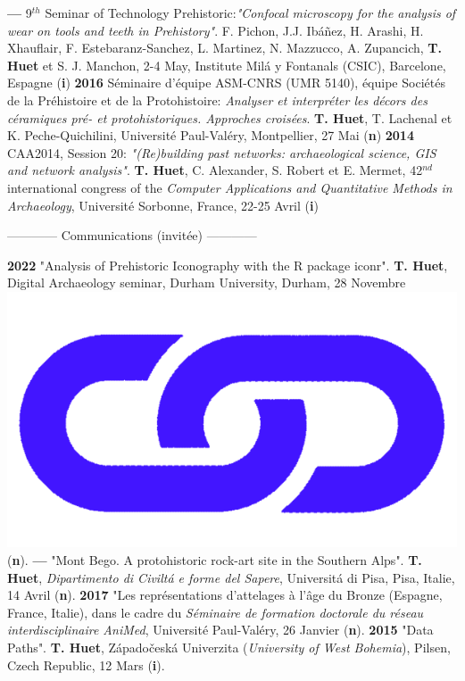 \documentclass{article}
\begin{document}
\smallbreak
\textbf{--- }9${}^{th}$ Seminar of Technology Prehistoric:\textit{"Confocal microscopy for the analysis of wear on tools and teeth in Prehistory"}. F. Pichon, J.J. Ibáñez, H. Arashi, H. Xhauflair, F. Estebaranz-Sanchez, L. Martinez, N. Mazzucco, A. Zupancich, \textbf{T. Huet} et S. J. Manchon, 2-4 May, Institute Milá y Fontanals (CSIC), Barcelone, Espagne (\textbf{i})
\smallbreak
\textbf{2016 }S\'{e}minaire d'\'{e}quipe ASM-CNRS (UMR 5140), \'{e}quipe Soci\'{e}t\'{e}s de la Pr\'{e}histoire et de la Protohistoire: \textit{Analyser et interpr\'{e}ter les d\'{e}cors des c\'{e}ramiques pr\'{e}- et protohistoriques. Approches crois\'{e}es}. \textbf{T. Huet}, T. Lachenal et K. Peche-Quichilini, Universit\'{e} Paul-Val\'{e}ry, Montpellier, 27 Mai (\textbf{n})
\smallbreak
\textbf{2014 }CAA2014, Session 20: \textit{"(Re)building past networks: archaeological science, GIS and network analysis"}. \textbf{T. Huet}, C. Alexander, S. Robert et E. Mermet, 42${}^{nd}$ international congress of the \textit{Computer Applications and Quantitative Methods in Archaeology}, Universit\'{e} Sorbonne, France, 22-25 Avril (\textbf{i})
\bigbreak

\begin{center}------------ Communications (invit\'{e}e) ------------\end{center}
\smallbreak

\textbf{2022 }"Analysis of Prehistoric Iconography with the R package iconr". \textbf{T. Huet}, Digital Archaeology seminar, Durham University, Durham, 28 Novembre \href{http://shinyserver.cfs.unipi.it:3838/durham/_site/#/title-slide}{\includegraphics[scale=0.02]{link_darkblue.png}} (\textbf{n}).
\smallbreak
\textbf{--- }"Mont Bego. A protohistoric rock-art site in the Southern Alps". \textbf{T. Huet}, \textit{Dipartimento di Civilt\'{a} e forme del Sapere}, Universit\'{a} di Pisa, Pisa, Italie, 14 Avril (\textbf{n}).
\smallbreak
\textbf{2017 }"Les repr\'{e}sentations d'attelages \`{a} l'\^{a}ge du Bronze (Espagne, France, Italie), dans le cadre du \textit{S\'{e}minaire de formation doctorale du r\'{e}seau interdisciplinaire AniMed}, Universit\'{e} Paul-Val\'{e}ry, 26 Janvier (\textbf{n}).
\smallbreak
\textbf{2015 }"Data Paths". \textbf{T. Huet}, Z\'{a}pado\v{c}esk\'{a} Univerzita (\textit{University of West Bohemia}), Pilsen, Czech Republic, 12 Mars (\textbf{i}).
\smallbreak
\end{document}
